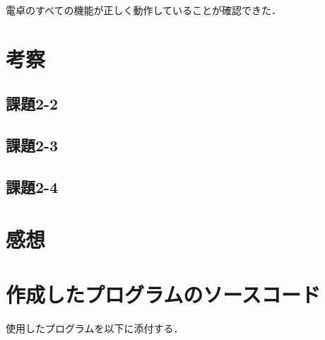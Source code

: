 電卓のすべての機能が正しく動作していることが確認できた．

\section{考察} \label{sec:review}

\subsection{課題2-2}

\subsection{課題2-3}

\subsection{課題2-4}


\section{感想}


\section{作成したプログラムのソースコード} \label{sec:makep}

使用したプログラムを以下に添付する．


